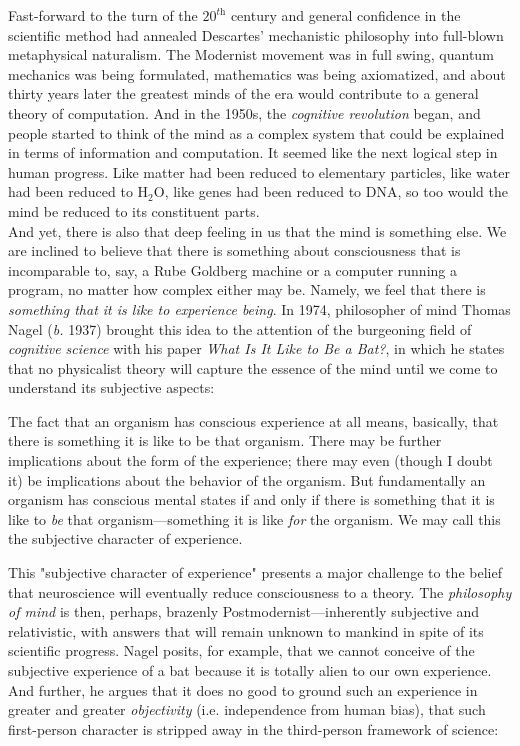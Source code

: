 \begin{tcolorbox}[breakable, enhanced, colback=textbook-blue, sharp corners]
	Fast-forward to the turn of the $20^\textit{th}$ century and general confidence in the scientific method had annealed Descartes' mechanistic philosophy into full-blown metaphysical naturalism. The Modernist movement was in full swing, quantum mechanics was being formulated, mathematics was being axiomatized, and about thirty years later the greatest minds of the era would contribute to a general theory of computation. And in the 1950s, the \textit{cognitive revolution} began, and people started to think of the mind as a complex system that could be explained in terms of information and computation. It seemed like the next logical step in human progress. Like matter had been reduced to elementary particles, like water had been reduced to H$_2$O, like genes had been reduced to DNA, so too would the mind be reduced to its constituent parts. \\
	
	And yet, there is also that deep feeling in us that the mind is something else. We are inclined to believe that there is something about consciousness that is incomparable to, say, a Rube Goldberg machine or a computer running a program, no matter how complex either may be. Namely, we feel that there is \textit{something that it is like to experience being}. In 1974, philosopher of mind Thomas Nagel (\textit{b.} 1937) brought this idea to the attention of the burgeoning field of \textit{cognitive science} with his paper \textit{What Is It Like to Be a Bat?}, in which he states that no physicalist theory will capture the essence of the mind until we come to understand its subjective aspects: \\
	
	\begin{displayquote}
		The fact that an organism has conscious experience at all means, basically, that there is something it is like to be that organism. There may be further implications about the form of the experience; there may even (though I doubt it) be implications about the behavior of the organism. But fundamentally an organism has conscious mental states if and only if there is something that it is like to \textit{be} that organism---something it is like \textit{for} the organism. We may call this the subjective character of experience. \\
	\end{displayquote}
	
	This "subjective character of experience" presents a major challenge to the belief that neuroscience will eventually reduce consciousness to a theory. The \textit{philosophy of mind} is then, perhaps, brazenly Postmodernist---inherently subjective and relativistic, with answers that will remain unknown to mankind in spite of its scientific progress. Nagel posits, for example, that we cannot conceive of the subjective experience of a bat because it is totally alien to our own experience. And further, he argues that it does no good to ground such an experience in greater and greater \textit{objectivity} (i.e. independence from human bias), that such first-person character is stripped away in the third-person framework of science: \\
	

\end{tcolorbox}

